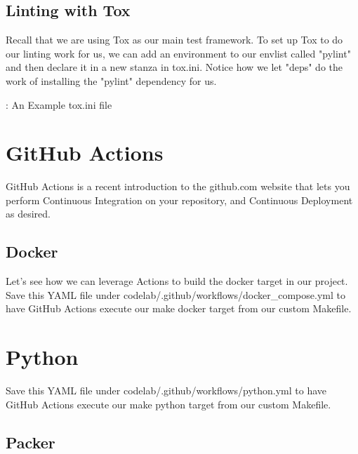 \subsection{Linting with Tox}

Recall that we are using Tox as our main test framework. To set up Tox
to do our linting work for us, we can add an environment to our envlist
called "pylint" and then declare it in a new stanza in tox.ini. Notice
how we let "deps" do the work of installing the "pylint" dependency for
us.

\begin{mybox}{\thetcbcounter: An Example tox.ini file}
	
\end{mybox}

\section{GitHub Actions}

\justify
GitHub Actions is a recent introduction to the github.com website that
lets you perform Continuous Integration on your repository, and Continuous Deployment as desired.

\subsection{Docker}

Let's see how we can leverage Actions to build the docker target in our
project. Save this YAML file under
codelab/.github/workflows/docker\_compose.yml to have GitHub Actions
execute our make docker target from our custom Makefile.

%	


\section{Python}

Save this YAML file under codelab/.github/workflows/python.yml to have
GitHub Actions execute our make python target from our custom Makefile.

%	

\subsection{Packer}

